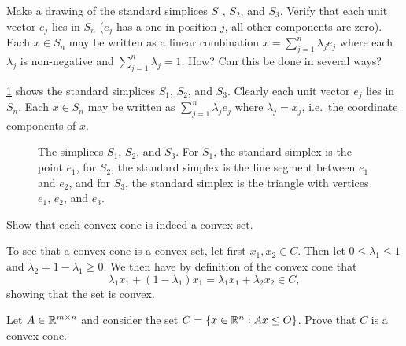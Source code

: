 \begin{exercise}
  Make a drawing of the standard simplices $S_1$, $S_2$, and $S_3$.
  Verify that each unit vector $e_j$ lies in $S_n$ ($e_j$ has a one in position $j$, all other components are zero).
  Each $x \in S_n$ may be written as a linear combination $x = \sum_{j=1}^{n} \lambda_j e_j$ where each $\lambda_j$ is non-negative and $\sum_{j = 1}^{n} \lambda_j = 1$.
  How?
  Can this be done in several ways?
\end{exercise}

\begin{solution}

  \cref{fig:simplices} shows the standard simplices $S_1$, $S_2$, and $S_3$.
  Clearly each unit vector $e_j$ lies in $S_n$.
  Each $x \in S_n$ may be written as $\sum_{j=1}^{n} \lambda_j e_j$ where $\lambda_j = x_j$, i.e.\ the coordinate components of $x$.

  \begin{figure}[htbp]
    \centering

    \resizebox{0.9\textwidth}{!}{
      
    }
    \caption{
      The simplices $S_1$, $S_2$, and $S_3$.
      For $S_1$, the standard simplex is the point $e_1$,
      for $S_2$, the standard simplex is the line segment between $e_1$ and $e_2$,
      and for $S_3$, the standard simplex is the triangle with vertices $e_1$, $e_2$, and $e_3$.\label{fig:simplices}
    }
  \end{figure}
\end{solution}

\begin{exercise}
  Show that each convex cone is indeed a convex set.
\end{exercise}

\begin{solution}
  To see that a convex cone is a convex set, let first $x_1,x_2 \in C$.
  Then let $0 \leq \lambda_1 \leq 1$ and $\lambda_2 = 1 - \lambda_1 \geq 0$.
  We then have by definition of the convex cone that
  \begin{equation}
    \lambda_1 x_1 + (1 - \lambda_1) x_1 = \lambda_1 x_1 + \lambda_2 x_2 \in C,
  \end{equation}
  showing that the set is convex.
\end{solution}

\begin{exercise}
  Let $A \in \mathbb{R}^{m \times n}$ and consider the set $C = \{ x \in \mathbb{R}^n : Ax \leq O \}$.
  Prove that $C$ is a convex cone.
\end{exercise}

